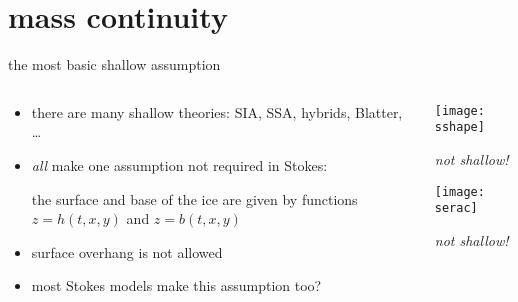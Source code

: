 
\section{mass continuity}

\begin{frame}{the most basic shallow assumption}

\begin{columns}

\begin{column}{0.6\textwidth}
\begin{itemize}
\item there are many shallow theories: SIA, SSA, hybrids, Blatter, \dots \nocite{Blatter}
\item \emph{all} make one assumption not required in Stokes:

\begin{center}
\alert{the surface and base of the ice are given by functions $z=h(t,x,y)$ and $z=b(t,x,y)$}
\end{center}
\item surface overhang is not allowed
\item most Stokes models make this assumption too?
\end{itemize}
\end{column}

\begin{column}{0.4\textwidth}
\texttt{[image: sshape]}

\scriptsize
\begin{center}
\emph{not shallow!}
\end{center}
\vspace{6mm}

\texttt{[image: serac]}

\begin{center}
\emph{not shallow!}
\end{center}
\end{column}
\end{columns}
\end{frame}


